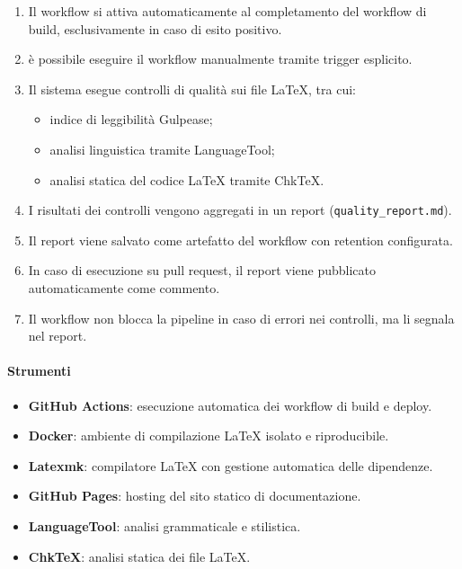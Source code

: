 \documentclass[a4paper, 11pt, oneside]{scrartcl}
\begin{document}
\begin{enumerate}
\begin{enumerate}[label=\alph*.]
        \item Il workflow si attiva automaticamente al completamento del workflow di build, esclusivamente in caso di esito positivo.
        \item è possibile eseguire il workflow manualmente tramite trigger esplicito.
        \item Il sistema esegue controlli di qualità sui file \LaTeX{}, tra cui:
        \begin{itemize}
            \item indice di leggibilità Gulpease;
            \item analisi linguistica tramite LanguageTool;
            \item analisi statica del codice \LaTeX{} tramite ChkTeX.
        \end{itemize}
        \item I risultati dei controlli vengono aggregati in un report (\texttt{quality\_report.md}).
        \item Il report viene salvato come artefatto del workflow con retention configurata.
        \item In caso di esecuzione su pull request, il report viene pubblicato automaticamente come commento.
        \item Il workflow non blocca la pipeline in caso di errori nei controlli, ma li segnala nel report.
    \end{enumerate}
\end{enumerate}

\paragraph{Strumenti}
\begin{itemize}
    \item \textbf{GitHub Actions}: esecuzione automatica dei workflow di build e deploy.
    \item \textbf{Docker}: ambiente di compilazione \LaTeX{} isolato e riproducibile.
    \item \textbf{Latexmk}: compilatore \LaTeX{} con gestione automatica delle dipendenze.
    \item \textbf{GitHub Pages}: hosting del sito statico di documentazione.
    \item \textbf{LanguageTool}: analisi grammaticale e stilistica.
    \item \textbf{ChkTeX}: analisi statica dei file \LaTeX{}.
\end{itemize}
\end{document}
